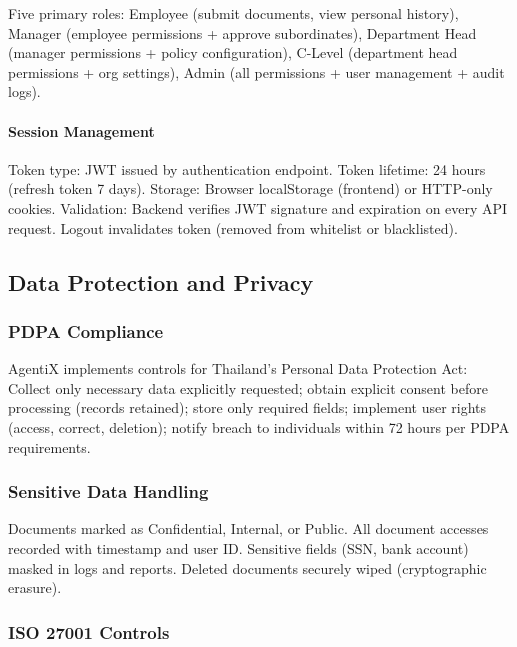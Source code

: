 \documentclass[12pt,oneside,openright,a4paper]{cpe-english-project}
\begin{document}
Five primary roles: Employee (submit documents, view personal history), Manager (employee permissions + approve subordinates), Department Head (manager permissions + policy configuration), C-Level (department head permissions + org settings), Admin (all permissions + user management + audit logs).

\paragraph{Session Management}

Token type: JWT issued by authentication endpoint. Token lifetime: 24 hours (refresh token 7 days). Storage: Browser localStorage (frontend) or HTTP-only cookies. Validation: Backend verifies JWT signature and expiration on every API request. Logout invalidates token (removed from whitelist or blacklisted).

\vspace{1em}

\subsection{Data Protection and Privacy}

\subsubsection{PDPA Compliance}

AgentiX implements controls for Thailand's Personal Data Protection Act: Collect only necessary data explicitly requested; obtain explicit consent before processing (records retained); store only required fields; implement user rights (access, correct, deletion); notify breach to individuals within 72 hours per PDPA requirements.

\subsubsection{Sensitive Data Handling}

Documents marked as Confidential, Internal, or Public. All document accesses recorded with timestamp and user ID. Sensitive fields (SSN, bank account) masked in logs and reports. Deleted documents securely wiped (cryptographic erasure).

\subsubsection{ISO 27001 Controls}
\end{document}
